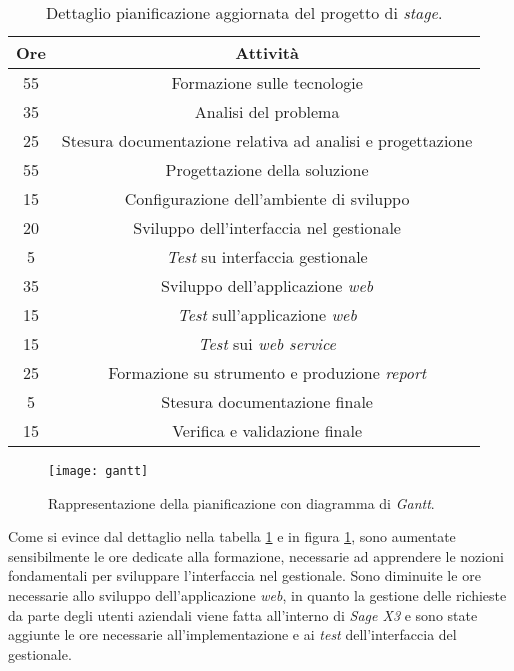 \begin{center}
	\begin{longtable}{ | c| c|} 		
		\caption{Dettaglio pianificazione aggiornata del progetto di \textit{stage}.}
		\label{table:requisiti-aggiornati}\\
		\hline
		\textbf{Ore} & \textbf{Attività}\\
		\hline
		55 & Formazione sulle tecnologie\\
		\hline
		35 & Analisi del problema\\
		\hline
		25 & Stesura documentazione relativa ad analisi e progettazione\\
		\hline
		55 & Progettazione della soluzione\\
		\hline
		15 & Configurazione dell'ambiente di sviluppo\\
		\hline
		20 & Sviluppo dell'interfaccia nel gestionale\\
		\hline
		5 & \textit{Test} su interfaccia gestionale\\
		\hline
		35 & Sviluppo dell'applicazione \textit{web}\\
		\hline
		15 & \textit{Test} sull'applicazione \textit{web}\\
		\hline
		15 & \textit{Test }sui \textit{web service}\\
		\hline
		25 & Formazione su strumento e produzione \textit{report}\\
		\hline
		5 & Stesura documentazione finale\\
		\hline
		15 & Verifica e validazione finale\\
		\hline
	\end{longtable}
\end{center}

\begin{figure}[htbp]
	\begin{center}
		\texttt{[image: gantt]}
		\caption{Rappresentazione della pianificazione con diagramma di \textit{Gantt}.}
		\label{fig:gantt}
	\end{center}
\end{figure}

\newpage

Come si evince dal dettaglio nella tabella \ref{table:requisiti-aggiornati} e in figura \ref{fig:gantt}, sono aumentate sensibilmente le ore dedicate alla formazione, necessarie ad apprendere le nozioni fondamentali per sviluppare l'interfaccia nel gestionale. Sono diminuite le ore necessarie allo sviluppo dell'applicazione \textit{web}, in quanto la gestione delle richieste da parte degli utenti aziendali viene fatta all'interno di \textit{Sage X3} e sono state aggiunte le ore necessarie all'implementazione e ai \textit{test} dell'interfaccia del gestionale.


